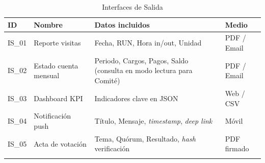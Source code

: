 {\small
\begin{longtable}{|p{}|p{}|p{}|p{}|}
\hline
\textbf{ID} & \textbf{Nombre} & \textbf{Datos incluidos} & \textbf{Medio} \\ \hline
IS\_01 & Reporte visitas & Fecha, RUN, Hora in/out, Unidad & PDF / Email \\ \hline
IS\_02 & Estado cuenta mensual & Periodo, Cargos, Pagos, Saldo (consulta en modo lectura para Comité) & PDF / Email \\ \hline
IS\_03 & Dashboard KPI & Indicadores clave en JSON & Web / CSV \\ \hline
IS\_04 & Notificación push & Título, Mensaje, \textit{timestamp}, \textit{deep link} & Móvil \\ \hline
IS\_05 & Acta de votación & Tema, Quórum, Resultado, \textit{hash} verificación & PDF firmado \\ \hline
\caption{Interfaces de Salida}
\label{tab:salida}
\end{longtable}
}
